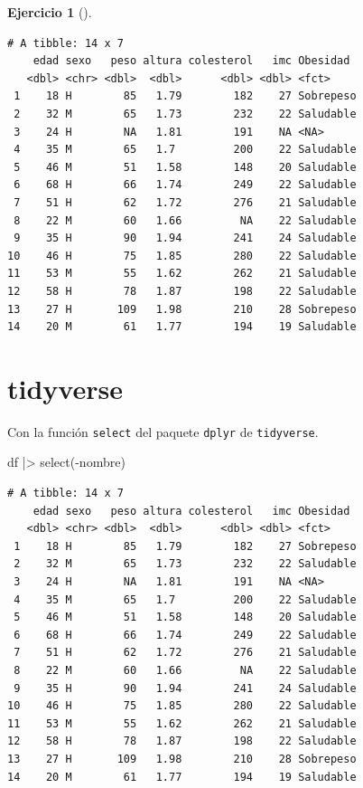 \documentclass[
  spanish,
  a4paper,
]{scrreport}
\newenvironment{Shaded}{\begin{snugshade}}{\end{snugshade}}
\newcommand{\FunctionTok}[1]{\textcolor[rgb]{0.28,0.35,0.67}{#1}}
\newcommand{\NormalTok}[1]{\textcolor[rgb]{0.00,0.23,0.31}{#1}}
\newcommand{\SpecialCharTok}[1]{\textcolor[rgb]{0.37,0.37,0.37}{#1}}
\theoremstyle{definition}
\newtheorem{exercise}{Ejercicio}[chapter]
\theoremstyle{remark}
\begin{document}
\begin{exercise}[]
\begin{enumerate}
\begin{tcolorbox}
\begin{verbatim}
# A tibble: 14 x 7
    edad sexo   peso altura colesterol   imc Obesidad 
   <dbl> <chr> <dbl>  <dbl>      <dbl> <dbl> <fct>    
 1    18 H        85   1.79        182    27 Sobrepeso
 2    32 M        65   1.73        232    22 Saludable
 3    24 H        NA   1.81        191    NA <NA>     
 4    35 M        65   1.7         200    22 Saludable
 5    46 M        51   1.58        148    20 Saludable
 6    68 H        66   1.74        249    22 Saludable
 7    51 H        62   1.72        276    21 Saludable
 8    22 M        60   1.66         NA    22 Saludable
 9    35 H        90   1.94        241    24 Saludable
10    46 H        75   1.85        280    22 Saludable
11    53 M        55   1.62        262    21 Saludable
12    58 H        78   1.87        198    22 Saludable
13    27 H       109   1.98        210    28 Sobrepeso
14    20 M        61   1.77        194    19 Saludable
\end{verbatim}

  \section{tidyverse}

  Con la función \texttt{select} del paquete \texttt{dplyr} de
  \texttt{tidyverse}.

\begin{Shaded}
\begin{Highlighting}[]
\NormalTok{df }\SpecialCharTok{|\textgreater{}} \FunctionTok{select}\NormalTok{(}\SpecialCharTok{{-}}\NormalTok{nombre)}
\end{Highlighting}
\end{Shaded}

\begin{verbatim}
# A tibble: 14 x 7
    edad sexo   peso altura colesterol   imc Obesidad 
   <dbl> <chr> <dbl>  <dbl>      <dbl> <dbl> <fct>    
 1    18 H        85   1.79        182    27 Sobrepeso
 2    32 M        65   1.73        232    22 Saludable
 3    24 H        NA   1.81        191    NA <NA>     
 4    35 M        65   1.7         200    22 Saludable
 5    46 M        51   1.58        148    20 Saludable
 6    68 H        66   1.74        249    22 Saludable
 7    51 H        62   1.72        276    21 Saludable
 8    22 M        60   1.66         NA    22 Saludable
 9    35 H        90   1.94        241    24 Saludable
10    46 H        75   1.85        280    22 Saludable
11    53 M        55   1.62        262    21 Saludable
12    58 H        78   1.87        198    22 Saludable
13    27 H       109   1.98        210    28 Sobrepeso
14    20 M        61   1.77        194    19 Saludable
\end{verbatim}


\end{tcolorbox}
\end{enumerate}
\end{exercise}
\end{document}
